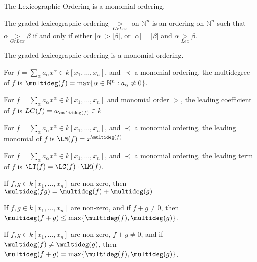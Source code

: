 \documentclass[crop=false,class=article,oneside]{standalone}
\begin{document}
        \begin{theorem}
        The Lexicographic Ordering is a monomial ordering.
        \end{theorem}
        \begin{definition}
        The graded lexicographic ordering $\underset{GrLex}{>}$ on $\mathbb{N}^n$ is an ordering on $\mathbb{N}^n$ such that $\alpha \underset{GrLex}{>}\beta$ if and only if either $|\alpha|>|\beta|$, or $|\alpha| = |\beta|$ and $\alpha \underset{Lex}{>}\beta$.
        \end{definition}
        \begin{theorem}
        The graded lexicographic ordering is a monomial ordering.
        \end{theorem}
        \begin{definition}
        For $f=\sum_{\alpha} a_{\alpha} x^\alpha \in k[x_1,\hdots ,x_n]$, and $\prec$ a monomial ordering, the multidegree of $f$ is $\multideg(f) = \max\{\alpha\in\mathbb{N}^n: a_{\alpha} \ne 0\}$.
        \end{definition}
        \begin{definition}
        For $f=\sum_{\alpha}a_\alpha x^\alpha \in k[x_1,\hdots ,x_n]$ and monomial order $>$, the leading coefficient of $f$ is $LC(f) =a_{\multideg(f)}\in k$
        \end{definition}
        \begin{definition}
        For $f=\sum_{\alpha} a_{\alpha} x^\alpha \in k[x_1,\hdots ,x_n]$, and $\prec$ a monomial ordering, the leading monomial of $f$ is $\LM(f) = x^{\multideg(f)}$
        \end{definition}
        \begin{definition}
        For $f=\sum_{\alpha} a_{\alpha} x^{\alpha} \in k[x_1,\hdots ,x_n]$, and $\prec$ a monomial ordering, the leading term of $f$ is $\LT(f) = \LC(f)\cdot \LM(f)$.
        \end{definition}
        \begin{theorem}
        If $f,g\in k[x_1,\hdots ,x_n]$ are non-zero, then $\multideg(fg)=\multideg(f)+\multideg(g)$
        \end{theorem}
        \begin{theorem}
        If $f,g\in k[x_1,\hdots ,x_n]$ are non-zero, and if $f+g \ne 0$, then $\multideg(f+g) \leq \max\{\multideg(f),\multideg(g)\}$.
        \end{theorem}
        \begin{theorem}
        If $f,g\in k[x_1,\hdots ,x_n]$ are non-zero, $f+g\ne 0$, and if $\multideg(f)\ne \multideg(g)$, then $\multideg(f+g) = \max\{\multideg(f),\multideg(g)\}$.
        \end{theorem}
\end{document}
